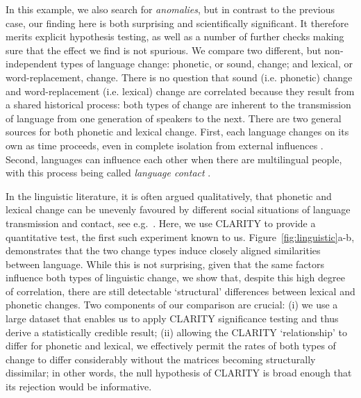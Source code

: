 \documentclass[a4]{article}
\newcommand{\+}[1]{\mathbf{#1}}
\begin{document}
In this example, we also search for \emph{anomalies}, but in contrast to the previous case, our finding here is both surprising and scientifically significant. It therefore merits explicit hypothesis testing, as well as a number of further checks making sure that the effect we find is not spurious. We compare two different, but non-independent types of language change: phonetic, or sound, change; and lexical, or word-replacement, change. There is no question that sound (i.e. phonetic) change and word-replacement (i.e. lexical) change are correlated because they result from a shared historical process: both types of change are inherent to the transmission of language from one generation of speakers to the next. There are two general sources for both phonetic and lexical change. First, each language changes on its own as time proceeds, even in complete isolation from external influences \cite{Trask-Millar-2015}. Second, languages can influence each other when there are multilingual people, with this process being called \emph{language contact} \cite{Matras-2009}. 


In the linguistic literature, it is often argued qualitatively, that phonetic and lexical change can be unevenly favoured by different social situations of language transmission and contact, see e.g.~\cite{Thomason_Kaufmann_1988}. Here, we use CLARITY to provide a quantitative test, the first such experiment known to us. Figure~\ref{fig:linguistic}a-b, demonstrates that the two change types induce  closely aligned similarities between language. While this is not surprising, given that the same factors influence both types of linguistic change, we show that, despite this high degree of correlation, there are still detectable `structural' differences between lexical and phonetic changes. Two components of our comparison are crucial: (i) we use a large dataset that enables us to apply CLARITY significance testing and thus derive a statistically credible result; (ii) allowing the CLARITY `relationship' to differ for phonetic and lexical, we effectively permit the rates of both types of change to differ considerably without the matrices becoming structurally dissimilar; in other words, the null hypothesis of CLARITY is broad enough that its rejection would be informative. 
\end{document}
